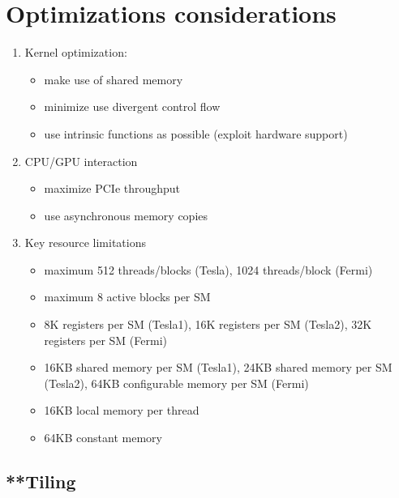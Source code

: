 \section{Optimizations considerations}
\label{sec:optim-cons}

\begin{enumerate}
\item Kernel optimization:
  \begin{itemize}
  \item make use of shared memory
  \item minimize use divergent control flow
  \item use intrinsic functions as possible (exploit hardware support)
  \end{itemize}
\item CPU/GPU interaction
  \begin{itemize}
  \item maximize PCIe throughput
  \item use asynchronous memory copies 
  \end{itemize}

\item Key resource limitations
  \begin{itemize}
  \item maximum 512 threads/blocks (Tesla), 1024 threads/block (Fermi)
  \item maximum 8 active blocks per SM
  \item 8K registers per SM (Tesla1), 16K registers per SM (Tesla2),
    32K registers per SM (Fermi)
  \item 16KB shared memory per SM (Tesla1), 24KB shared memory per SM
    (Tesla2), 64KB configurable memory per SM (Fermi)
  \item 16KB local memory per thread
  \item 64KB constant memory
  \end{itemize}
\end{enumerate}

\subsection{**Tiling}
\label{sec:tiling-1}

